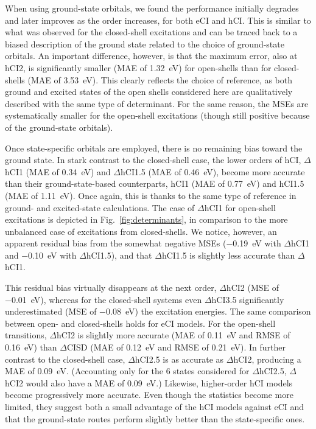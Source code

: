 \documentclass[aip,jcp,reprint,noshowkeys,superscriptaddress]{revtex4-1}
\begin{document}
When using ground-state orbitals, we found the performance initially degrades and later improves as the order increases, for both eCI and hCI.
This is similar to what was observed for the closed-shell excitations
and can be traced back to a biased description of the ground state related to the choice of ground-state orbitals.
An important difference, however, is that the maximum error, also at hCI2, is significantly smaller (MAE of \SI{1.32}{\eV}) for open-shells
than for closed-shells (MAE of \SI{3.53}{\eV}).
This clearly reflects the choice of reference, as both ground and excited states of the open shells considered here are qualitatively described with the same type of determinant.
For the same reason, the MSEs are systematically smaller for the open-shell excitations (though still positive because of the ground-state orbitals).

Once state-specific orbitals are employed, there is no remaining bias toward the ground state.
In stark contrast to the closed-shell case, the lower orders of hCI, $\Delta$hCI1 (MAE of \SI{0.34}{\eV}) and $\Delta$hCI1.5 (MAE of \SI{0.46}{\eV}),
become more accurate than their ground-state-based counterparts, hCI1 (MAE of \SI{0.77}{\eV}) and hCI1.5 (MAE of \SI{1.11}{\eV}).
Once again, this is thanks to the same type of reference in ground- and excited-state calculations.
The case of $\Delta$hCI1 for open-shell excitations is depicted in Fig.~\ref{fig:determinants}, in comparison to the more unbalanced case of excitations from closed-shells.
We notice, however, an apparent residual bias from the somewhat negative MSEs (\SI{-0.19}{\eV} with $\Delta$hCI1 and \SI{-0.10}{\eV} with $\Delta$hCI1.5),
and that $\Delta$hCI1.5 is slightly less accurate than $\Delta$hCI1.

This residual bias virtually disappears at the next order, $\Delta$hCI2 (MSE of \SI{-0.01}{\eV}),
whereas for the closed-shell systems even $\Delta$hCI3.5 significantly underestimated (MSE of \SI{-0.08}{\eV}) the excitation energies.
The same comparison between open- and closed-shells holds for eCI models.
For the open-shell transitions, $\Delta$hCI2 is slightly more accurate (MAE of \SI{0.11}{\eV} and RMSE of \SI{0.16}{\eV}) than $\Delta$CISD (MAE of \SI{0.12}{\eV} and RMSE of \SI{0.21}{\eV}).
In further contrast to the closed-shell case,
$\Delta$hCI2.5 is as accurate as $\Delta$hCI2, producing a MAE of \SI{0.09}{\eV}.
(Accounting only for the 6 states considered for $\Delta$hCI2.5, $\Delta$hCI2 would also have a MAE of \SI{0.09}{\eV}.)
Likewise, higher-order hCI models become progressively more accurate.
Even though the statistics become more limited,
they suggest both a small advantage of the hCI models against eCI
and that the ground-state routes perform slightly better than the state-specific ones.
\end{document}
